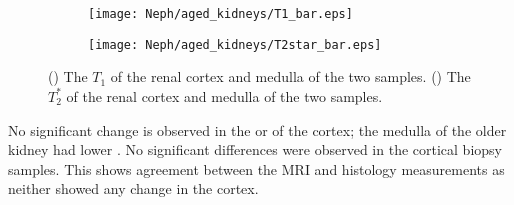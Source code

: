 \begin{figure}[H]
	\centering
	\begin{subfigure}[c]{0.47\textwidth}
		\centering
		\texttt{[image: Neph/aged\_kidneys/T1\_bar.eps]}
		\caption{}
		\label{fig:ex_aged_t1_bar}
	\end{subfigure}
	\hfill
	\begin{subfigure}[c]{0.47\textwidth}
		\centering
		\texttt{[image: Neph/aged\_kidneys/T2star\_bar.eps]}
		\caption{}
		\label{fig:ex_aged_t2star_bar}
	\end{subfigure}
	\caption{() The $T_1$ of the renal cortex and medulla of the two samples. () The $T_2^*$ of the renal cortex and medulla of the two samples.}
	\label{fig:ex_aged_bar}
\end{figure}

No significant change is observed in the \tone or \ttwostar of the cortex; the medulla of the older kidney had lower \tone. No significant differences were observed in the cortical biopsy samples. This shows agreement between the \ac{MRI} and histology measurements as neither showed any change in the cortex. 

